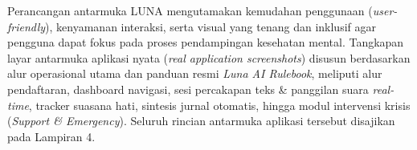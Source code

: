 
Perancangan antarmuka LUNA mengutamakan kemudahan penggunaan (\textit{user-friendly}), kenyamanan interaksi, serta visual yang tenang dan inklusif agar pengguna dapat fokus pada proses pendampingan kesehatan mental. Tangkapan layar antarmuka aplikasi nyata (\textit{real application screenshots}) disusun berdasarkan alur operasional utama dan panduan resmi \textit{Luna AI Rulebook}, meliputi alur pendaftaran, dashboard navigasi, sesi percakapan teks \& panggilan suara \textit{real-time}, tracker suasana hati, sintesis jurnal otomatis, hingga modul intervensi krisis (\textit{Support \& Emergency}). Seluruh rincian antarmuka aplikasi tersebut disajikan pada Lampiran 4.
